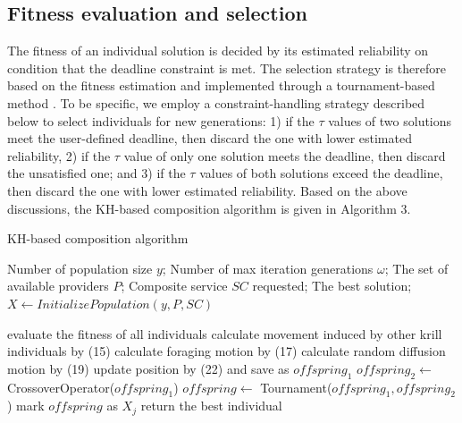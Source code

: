 \documentclass[journal]{IEEEtran}
\begin{document}
\subsection{Fitness evaluation and selection}
The fitness of an individual solution is decided by its estimated reliability on condition that the deadline constraint is met.
The selection strategy is therefore based on the fitness estimation and implemented through a tournament-based method \cite{whitley1994genetic}. To be specific, we employ a constraint-handling strategy described below to select individuals for new generations: 
1) if the $\tau$ values of two solutions meet the user-defined deadline, then discard the one with lower estimated reliability, 2) if the $\tau$ value of only one solution meets the deadline, then discard the unsatisfied one; and 3) if the $\tau$ values of both solutions exceed the deadline, then discard the one with lower estimated reliability.
Based on the above discussions, the KH-based composition algorithm is given in Algorithm 3.

\begin{algorithm}
\caption{KH-based composition algorithm}
\label{KH}
\begin{algorithmic}[1]

\REQUIRE Number of population size $y$; Number of max iteration generations $\omega$; The set of available providers $P$;  Composite service $SC$ requested;
\ENSURE The best solution;
\STATE $X \leftarrow InitializePopulation(y,P,SC)$

  \STATE evaluate the fitness of all individuals
    \STATE calculate movement induced by other krill individuals by (15)
    \STATE calculate foraging motion by (17)
    \STATE calculate random diffusion motion by (19)
    \STATE update position by (22) and save as $offspring_1$
    \STATE $offspring_2 \leftarrow $ CrossoverOperator($offspring_1$)
    \STATE $offspring \leftarrow $ Tournament($offspring_1, offspring_2$)
    \STATE mark $offspring$ as $X_j$
  \ENDFOR
\ENDFOR
\STATE return the best individual
\end{algorithmic}
\end{algorithm}
\end{document}
